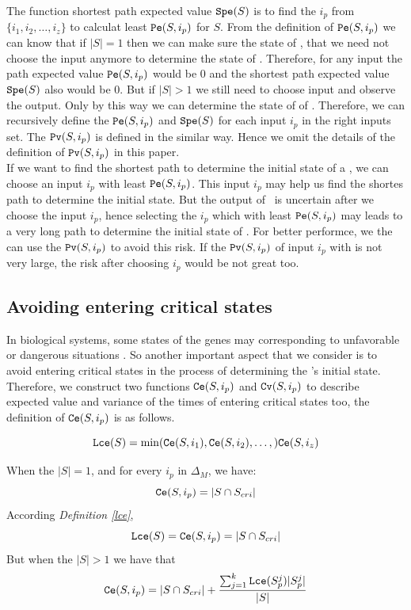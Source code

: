 The function shortest path  expected value ${\tt Spe}(S)$ is to find the $i_p$ from $\{i_1,i_2,\ldots, i_z\}$ to calculat least ${\tt Pe}(S, i_p)$ for $S$. From the definition of ${\tt Pe}(S, i_p)$ we can know that if $|S|=1$ then we can make sure the state of \BCNs, that we need not choose the input anymore to determine the state of \BCNs. Therefore, for any input the path expected value ${\tt Pe}(S, i_p)$ would be $0$ and the shortest path expected value ${\tt Spe}(S)$ also would be $0$. But if $|S|>1$ we still need to choose input and observe the output. Only by this way we can determine the state of of \BCNs. Therefore, we can recursively define the ${\tt Pe}(S, i_p)$ and ${\tt Spe}(S)$ for each input $i_p$ in the right inputs set. The ${\tt Pv}(S, i_p)$ is defined in the similar way. Hence we omit the details of the definition of ${\tt Pv}(S, i_p)$ in this paper. \\

If we want to find the shortest path to determine the initial state of a \BCN, we can choose an input $i_p$ with least ${\tt Pe}(S, i_p)$. This input $i_p$ may help us find the shortes path to determine the initial state. But the output of \BCNs\ is uncertain after we choose the input $i_p$, hence selecting the $i_p$ which with least ${\tt Pe}(S, i_p)$ may leads to a very long path to determine the initial state of \BCNs. For better performce, we the can use the ${\tt Pv}(S, i_p)$ to avoid this risk. If the ${\tt Pv}(S, i_p)$ of input $i_p$ with is not very large, the risk after choosing $i_p$ would be not great too.
\subsection{Avoiding entering critical states}
In biological systems, some states of the genes may corresponding to unfavorable or dangerous situations \cite{Li2014Controllability}. So another important aspect that we consider is to avoid entering critical states in the process of determining the \BCN's initial state. Therefore, we construct two functions $\Ce(S, i_p)$ and ${\tt Cv}(S, i_p)$ to describe expected value and variance of the times of entering critical states too, the definition of $\Ce(S, i_p)$ is as follows.\\
\begin{definition}[$\Lce(S)$] \label{lce}
\[{\tt Lce}(S)= \min({\tt Ce}(S, i_1),{\tt Ce}(S, i_2),\ldots,){\tt Ce}(S, i_z)\]
\end{definition}
\begin{definition}[$\Ce(S, i_p)$] 
When the $|S|=1$, and for every $i_p$ in $\Delta_M$, we have: \[{\tt Ce}(S, i_p)=|S \cap S_{cri} |\] 
According {\em Definition \ref{lce}}, %
\[{\tt Lce}(S)={\tt Ce}(S, i_p)=|S \cap S_{cri} |\] 
But when the $|S|>1$ 
we have that 
\[{\tt Ce}(S, i_p)=|S \cap S_{cri} | +\frac{\sum_{j=1}^k {\tt Lce}(S_p^j)|S_p^j|}{ |S|} \] 
\end{definition}

